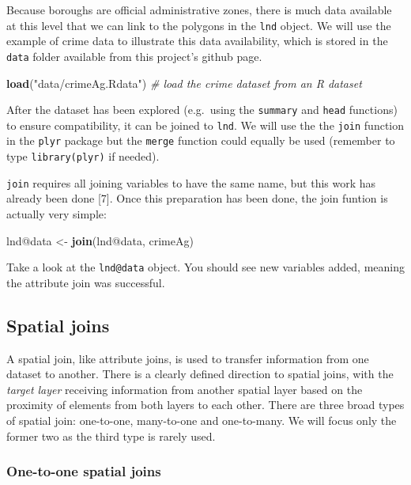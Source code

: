 \documentclass[]{article}
\newenvironment{Shaded}{}{}
\newcommand{\KeywordTok}[1]{\textcolor[rgb]{0.00,0.44,0.13}{\textbf{{#1}}}}
\newcommand{\StringTok}[1]{\textcolor[rgb]{0.25,0.44,0.63}{{#1}}}
\newcommand{\CommentTok}[1]{\textcolor[rgb]{0.38,0.63,0.69}{\textit{{#1}}}}
\newcommand{\NormalTok}[1]{{#1}}
\begin{document}
Because boroughs are official administrative zones, there is much data
available at this level that we can link to the polygons in the
\texttt{lnd} object. We will use the example of crime data to illustrate
this data availability, which is stored in the \texttt{data} folder
available from this project's github page.

\begin{Shaded}
\begin{Highlighting}[]
\KeywordTok{load}\NormalTok{(}\StringTok{"data/crimeAg.Rdata"}\NormalTok{)  }\CommentTok{# load the crime dataset from an R dataset}
\end{Highlighting}
\end{Shaded}
After the dataset has been explored (e.g.~using the \texttt{summary} and
\texttt{head} functions) to ensure compatibility, it can be joined to
\texttt{lnd}. We will use the the \texttt{join} function in the
\texttt{plyr} package but the \texttt{merge} function could equally be
used (remember to type \texttt{library(plyr)} if needed).

\texttt{join} requires all joining variables to have the same name, but
this work has already been done {[}7{]}. Once this preparation has been
done, the join funtion is actually very simple:

\begin{Shaded}
\begin{Highlighting}[]
\NormalTok{lnd@data <- }\KeywordTok{join}\NormalTok{(lnd@data, crimeAg)}
\end{Highlighting}
\end{Shaded}
Take a look at the \texttt{lnd@data} object. You should see new
variables added, meaning the attribute join was successful.

\subsection{Spatial joins}

A spatial join, like attribute joins, is used to transfer information
from one dataset to another. There is a clearly defined direction to
spatial joins, with the \emph{target layer} receiving information from
another spatial layer based on the proximity of elements from both
layers to each other. There are three broad types of spatial join:
one-to-one, many-to-one and one-to-many. We will focus only the former
two as the third type is rarely used.

\subsubsection{One-to-one spatial joins}
\end{document}
